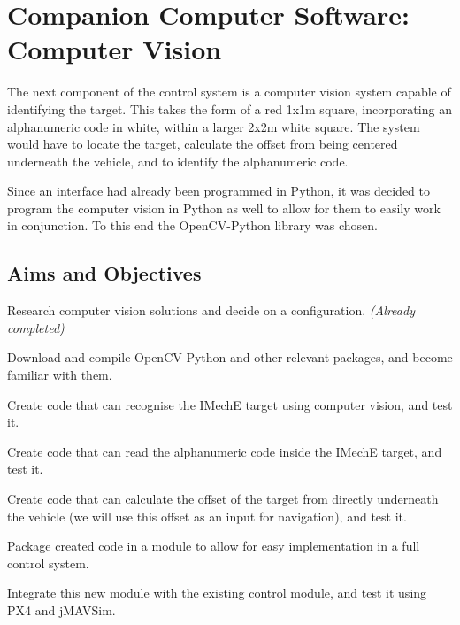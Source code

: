 \documentclass[11pt]{article}
\begin{document}
\section{Companion Computer Software: Computer Vision}
The next component of the control system is a computer vision system capable of identifying the target. This takes the form of a red 1x1m square, incorporating an alphanumeric code in white, within a larger 2x2m white square\cite{IMechE_rules}. The system would have to locate the target, calculate the offset from being centered underneath the vehicle, and to identify the alphanumeric code.

Since an interface had already been programmed in Python, it was decided to program the computer vision in Python as well to allow for them to easily work in conjunction. To this end the OpenCV-Python library was chosen.

\subsection{Aims and Objectives}
\begin{compactenum}
    \item Research computer vision solutions and decide on a configuration. \emph{(Already completed)}
    \item Download and compile OpenCV-Python and other relevant packages, and become familiar with them.
    \item Create code that can recognise the IMechE target using computer vision, and test it.
    \item Create code that can read the alphanumeric code inside the IMechE target, and test it.
    \item Create code that can calculate the offset of the target from directly underneath the vehicle (we will use this offset as an input for navigation), and test it.
    \item Package created code in a module to allow for easy implementation in a full control system.
    \item Integrate this new module with the existing control module, and test it using PX4 and jMAVSim.
\end{compactenum}
\end{document}
